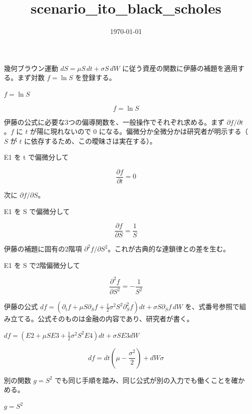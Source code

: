 \documentclass[dvipdfmx,a4paper,11pt]{jsarticle}
\title{scenario\_ito\_black\_scholes}
\date{\today}
\begin{document}
\maketitle

幾何ブラウン運動 $dS=\mu S\,dt+\sigma S\,dW$ に従う資産の関数に伊藤の補題を適用する。まず対数 $f=\ln S$ を登録する。

$f = \ln S$

\begin{equation}
  f = \ln S
  \label{eq:E1}
\end{equation}

伊藤の公式に必要な3つの偏導関数を、一般操作でそれぞれ求める。まず $\partial f/\partial t$。$f$ に $t$ が陽に現れないので 0 になる。偏微分か全微分かは研究者が明示する（$S$ が $t$ に依存するため、この曖昧さは実在する）。

E1 を t で偏微分して

\begin{equation}
  \frac{\partial f}{\partial t} = 0
  \label{eq:E2}
\end{equation}

次に $\partial f/\partial S$。

E1 を S で偏微分して

\begin{equation}
  \frac{\partial f}{\partial S} = \frac{1}{S}
  \label{eq:E3}
\end{equation}

伊藤の補題に固有の2階項 $\partial^2 f/\partial S^2$。これが古典的な連鎖律との差を生む。

E1 を S で2階偏微分して

\begin{equation}
  \frac{\partial^{2} f}{\partial S^{2}} = -\frac{1}{S^2}
  \label{eq:E4}
\end{equation}

伊藤の公式 $df=(\partial_t f+\mu S\partial_S f+\frac12\sigma^2S^2\partial_S^2 f)dt+\sigma S\partial_S f\,dW$ を、式番号参照で組み立てる。公式そのものは金融の内容であり、研究者が書く。

$df = (E2 + \mu S E3 + \frac{1}{2}\sigma^2 S^2 E4) dt + \sigma S E3 dW$

\begin{equation}
  df=dt \left(\mu-\frac{\sigma^2}{2}\right)+dW \sigma
  \label{eq:E5}
\end{equation}

別の関数 $g=S^2$ でも同じ手順を踏み、同じ公式が別の入力でも働くことを確かめる。

$g = S^2$
\end{document}
